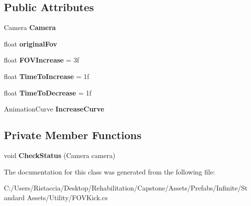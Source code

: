 \subsection*{Public Attributes}
\begin{DoxyCompactItemize}
\item 
\mbox{\label{class_unity_standard_assets_1_1_utility_1_1_f_o_v_kick_a3ae90ba267d5979aa59950ed4f76d78f}} 
Camera {\bfseries Camera}
\item 
\mbox{\label{class_unity_standard_assets_1_1_utility_1_1_f_o_v_kick_a4969e492fb48a6d65f9d022b4b5b3b50}} 
float {\bfseries original\+Fov}
\item 
\mbox{\label{class_unity_standard_assets_1_1_utility_1_1_f_o_v_kick_a000532bb540999d880107469e14b1d61}} 
float {\bfseries F\+O\+V\+Increase} = 3f
\item 
\mbox{\label{class_unity_standard_assets_1_1_utility_1_1_f_o_v_kick_abe3ae5ad6ab9e75ed866ed84b20aa1ba}} 
float {\bfseries Time\+To\+Increase} = 1f
\item 
\mbox{\label{class_unity_standard_assets_1_1_utility_1_1_f_o_v_kick_a5624579aac52e515f99d244c73852e73}} 
float {\bfseries Time\+To\+Decrease} = 1f
\item 
\mbox{\label{class_unity_standard_assets_1_1_utility_1_1_f_o_v_kick_a17f2bd98b1e8913e420b8032ff94c6cc}} 
Animation\+Curve {\bfseries Increase\+Curve}
\end{DoxyCompactItemize}
\subsection*{Private Member Functions}
\begin{DoxyCompactItemize}
\item 
\mbox{\label{class_unity_standard_assets_1_1_utility_1_1_f_o_v_kick_a700613edd3afc9152b520551ada60a77}} 
void {\bfseries Check\+Status} (Camera camera)
\end{DoxyCompactItemize}


The documentation for this class was generated from the following file\+:\begin{DoxyCompactItemize}
\item 
C\+:/\+Users/\+Ristaccia/\+Desktop/\+Rehabilitation/\+Capstone/\+Assets/\+Prefabs/\+Infinite/\+Standard Assets/\+Utility/F\+O\+V\+Kick.\+cs\end{DoxyCompactItemize}
